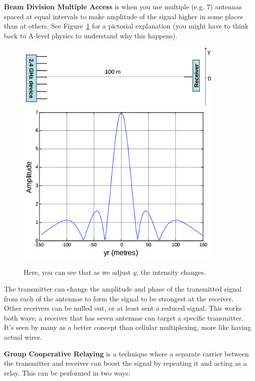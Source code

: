 \textbf{Beam Division Multiple Access} is when you use multiple (e.g. 7)
antennas spaced at equal intervals to make amplitude of the signal higher in
some places than at others. See Figure~\ref{BDMA} for a pictorial explanation
(you might have to think back to A-level physics to understand why this
happens).

\begin{figure}[ht]
  \includegraphics[width=0.9\textwidth]{images/beam-forming}
  \includegraphics[width=0.9\textwidth]{images/beam-forming-intensity}
  \caption{Here, you can see that as we adjust $y$, the intensity changes.}
  \label{BDMA}
\end{figure}

The transmitter can change the amplitude and phase of the transmitted signal
from each of the antennae to form the signal to be strongest at the receiver.
Other receivers can be nulled out, or at least sent a reduced signal. This works
both ways; a receiver that has seven antennae can target a specific transmitter.
It's seen by many as a better concept than cellular multiplexing, more like
having actual wires.

\textbf{Group Cooperative Relaying} is a technique where a separate carrier
between the transmitter and receiver can boost the signal by repeating it and
acting as a relay. This can be performed in two ways:

